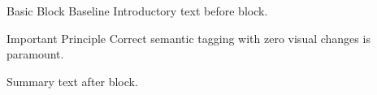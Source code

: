 \documentclass[14pt,t]{beamer-accessibility}
\begin{document}
\begin{frame}{Basic Block Baseline}
Introductory text before block.

\begin{block}{Important Principle}
Correct semantic tagging with zero visual changes is paramount.
\end{block}

Summary text after block.
\end{frame}
\end{document}
